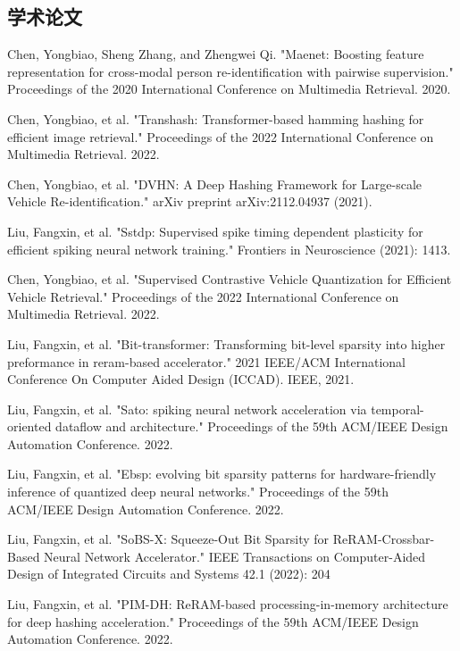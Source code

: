 
\begin{achievements}

\subsection*{学术论文}

\begin{bibliolist}{00}
  \item Chen, Yongbiao, Sheng Zhang, and Zhengwei Qi. "Maenet: Boosting feature representation for cross-modal person re-identification with pairwise supervision." Proceedings of the 2020 International Conference on Multimedia Retrieval. 2020.
  \item Chen, Yongbiao, et al. "Transhash: Transformer-based hamming hashing for efficient image retrieval." Proceedings of the 2022 International Conference on Multimedia Retrieval. 2022.
  \item Chen, Yongbiao, et al. "DVHN: A Deep Hashing Framework for Large-scale Vehicle Re-identification." arXiv preprint arXiv:2112.04937 (2021).
  \item Liu, Fangxin, et al. "Sstdp: Supervised spike timing dependent plasticity for efficient spiking neural network training." Frontiers in Neuroscience (2021): 1413.
  \item Chen, Yongbiao, et al. "Supervised Contrastive Vehicle Quantization for Efficient Vehicle Retrieval." Proceedings of the 2022 International Conference on Multimedia Retrieval. 2022.
  \item Liu, Fangxin, et al. "Bit-transformer: Transforming bit-level sparsity into higher preformance in reram-based accelerator." 2021 IEEE/ACM International Conference On Computer Aided Design (ICCAD). IEEE, 2021.
  \item Liu, Fangxin, et al. "Sato: spiking neural network acceleration via temporal-oriented dataflow and architecture." Proceedings of the 59th ACM/IEEE Design Automation Conference. 2022.
  \item Liu, Fangxin, et al. "Ebsp: evolving bit sparsity patterns for hardware-friendly inference of quantized deep neural networks." Proceedings of the 59th ACM/IEEE Design Automation Conference. 2022.
  \item Liu, Fangxin, et al. "SoBS-X: Squeeze-Out Bit Sparsity for ReRAM-Crossbar-Based Neural Network Accelerator." IEEE Transactions on Computer-Aided Design of Integrated Circuits and Systems 42.1 (2022): 204
  \item Liu, Fangxin, et al. "PIM-DH: ReRAM-based processing-in-memory architecture for deep hashing acceleration." Proceedings of the 59th ACM/IEEE Design Automation Conference. 2022.
\end{bibliolist}


\end{achievements}
